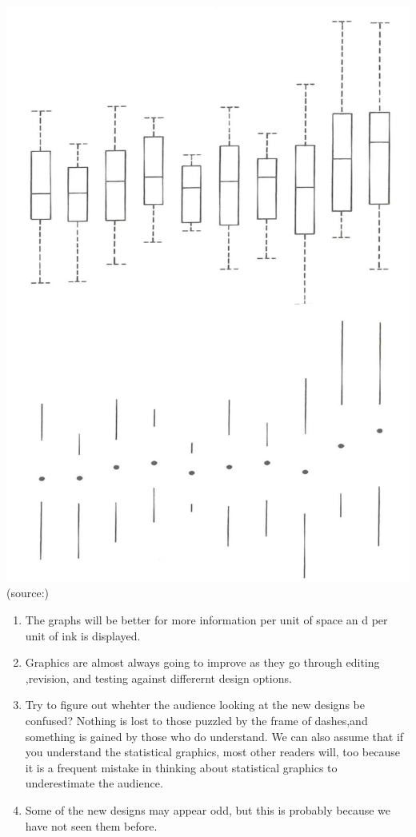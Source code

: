\documentclass[]{book}
\providecommand{\tightlist}{%
  \setlength{\itemsep}{0pt}\setlength{\parskip}{0pt}}
\theoremstyle{definition}
\theoremstyle{definition}
\theoremstyle{definition}
\theoremstyle{remark}
\begin{document}
\includegraphics{images/Tufte_figure4.png} (source:\citep{Tufte_2001})

\begin{enumerate}
\def\labelenumi{\arabic{enumi}.}
\tightlist
\item
  The graphs will be better for more information per unit of space an d
  per unit of ink is displayed.
\item
  Graphics are almost always going to improve as they go through editing
  ,revision, and testing against differernt design options.
\item
  Try to figure out whehter the audience looking at the new designs be
  confused? Nothing is lost to those puzzled by the frame of dashes,and
  something is gained by those who do understand. We can also assume
  that if you understand the statistical graphics, most other readers
  will, too because it is a frequent mistake in thinking about
  statistical graphics to underestimate the audience.
\item
  Some of the new designs may appear odd, but this is probably because
  we have not seen them before.
\end{enumerate}
\end{document}
